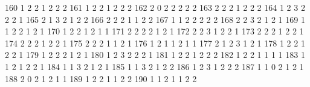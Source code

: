 \documentclass[
  letterpaper,
  DIV=11,
  numbers=noendperiod]{scrreprt}
\newenvironment{Shaded}{\begin{snugshade}}{\end{snugshade}}
\newcommand{\NormalTok}[1]{\textcolor[rgb]{0.00,0.23,0.31}{#1}}
\begin{document}
\begin{Shaded}
\begin{Highlighting}[]
\NormalTok{160              1     2         2            1        2         2      2}
\NormalTok{161              1     2         2            1        2         2      2}
\NormalTok{162              2     0         2            2        2         2      2}
\NormalTok{163              2     2         2            1        2         2      2}
\NormalTok{164              1     2         3            2        2         2      1}
\NormalTok{165              2     1         3            2        1         2      2}
\NormalTok{166              2     2         2            1        1         2      2}
\NormalTok{167              1     1         2            2        2         2      2}
\NormalTok{168              2     2         3            2        1         2      1}
\NormalTok{169              1     1         2            2        1         2      1}
\NormalTok{170              1     2         2            1        2         1      1}
\NormalTok{171              2     2         2            2        1         2      1}
\NormalTok{172              2     2         3            1        2         2      1}
\NormalTok{173              2     2         2            1        2         2      1}
\NormalTok{174              2     2         2            1        2         2      1}
\NormalTok{175              2     2         2            1        1         2      1}
\NormalTok{176              1     2         1            1        2         1      1}
\NormalTok{177              2     1         2            3        1         2      1}
\NormalTok{178              1     2         2            1        2         2      1}
\NormalTok{179              1     2         2            2        1         2      1}
\NormalTok{180              1     2         3            2        2         2      1}
\NormalTok{181              1     2         2            1        2         2      2}
\NormalTok{182              1     2         2            1        1         1      1}
\NormalTok{183              1     1         2            1        2         2      1}
\NormalTok{184              1     1         3            2        1         2      1}
\NormalTok{185              1     1         3            2        1         2      2}
\NormalTok{186              1     2         3            1        2         2      2}
\NormalTok{187              1     1         0            2        1         2      1}
\NormalTok{188              2     0         2            1        2         1      1}
\NormalTok{189              1     2         2            1        1         2      2}
\NormalTok{190              1     1         2            1        1         2      2}

\end{Highlighting}
\end{Shaded}
\end{document}
